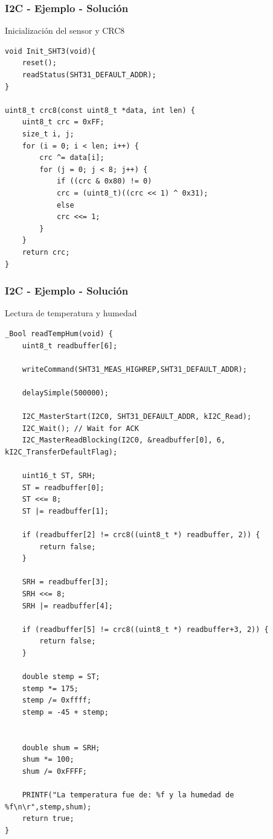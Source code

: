 \documentclass[10.5pt,scale=1.0,t,aspectratio=169,hyperref={pdfpagelabels=false}]{beamer}
\begin{document}
\begin{frame}[fragile]
	\frametitle{I2C - Ejemplo - Solución}
	{\tiny
		Inicialización del sensor y CRC8
		\begin{lstlisting}[style=CStyle]
void Init_SHT3(void){
	reset();
	readStatus(SHT31_DEFAULT_ADDR);
}

uint8_t crc8(const uint8_t *data, int len) {
	uint8_t crc = 0xFF;
	size_t i, j;
	for (i = 0; i < len; i++) {
		crc ^= data[i];
		for (j = 0; j < 8; j++) {
			if ((crc & 0x80) != 0)
			crc = (uint8_t)((crc << 1) ^ 0x31);
			else
			crc <<= 1;
		}
	}
	return crc;
}

		\end{lstlisting}		
	}
\end{frame}
\begin{frame}[fragile]
	\frametitle{I2C - Ejemplo - Solución}
	{\tiny
		Lectura de temperatura y humedad
		\begin{multicols}{2}
			\begin{lstlisting}[style=CStyle]
_Bool readTempHum(void) {
	uint8_t readbuffer[6];
	
	writeCommand(SHT31_MEAS_HIGHREP,SHT31_DEFAULT_ADDR);
	
	delaySimple(500000);
	
	I2C_MasterStart(I2C0, SHT31_DEFAULT_ADDR, kI2C_Read);
	I2C_Wait();	// Wait for ACK
	I2C_MasterReadBlocking(I2C0, &readbuffer[0], 6, kI2C_TransferDefaultFlag);
	
	uint16_t ST, SRH;
	ST = readbuffer[0];
	ST <<= 8;
	ST |= readbuffer[1];
	
	if (readbuffer[2] != crc8((uint8_t *) readbuffer, 2)) {
		return false;
	}
	
	SRH = readbuffer[3];
	SRH <<= 8;
	SRH |= readbuffer[4];
	
	if (readbuffer[5] != crc8((uint8_t *) readbuffer+3, 2)) {
		return false;
	}
	
	double stemp = ST;
	stemp *= 175;
	stemp /= 0xffff;
	stemp = -45 + stemp;
	
	
	double shum = SRH;
	shum *= 100;
	shum /= 0xFFFF;
	
	PRINTF("La temperatura fue de: %f y la humedad de %f\n\r",stemp,shum);
	return true;
}
				
			\end{lstlisting}		
		\end{multicols}
		
	}
\end{frame}
\end{document}
